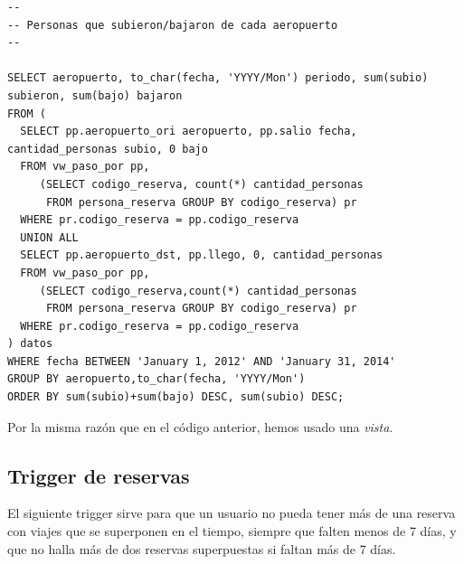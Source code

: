 \documentclass[a4paper,10pt]{article}
\begin{document}
\begin{verbatim}
--
-- Personas que subieron/bajaron de cada aeropuerto
--

SELECT aeropuerto, to_char(fecha, 'YYYY/Mon') periodo, sum(subio) subieron, sum(bajo) bajaron 
FROM (
  SELECT pp.aeropuerto_ori aeropuerto, pp.salio fecha, cantidad_personas subio, 0 bajo
  FROM vw_paso_por pp,
     (SELECT codigo_reserva, count(*) cantidad_personas
      FROM persona_reserva GROUP BY codigo_reserva) pr
  WHERE pr.codigo_reserva = pp.codigo_reserva
  UNION ALL
  SELECT pp.aeropuerto_dst, pp.llego, 0, cantidad_personas
  FROM vw_paso_por pp,
     (SELECT codigo_reserva,count(*) cantidad_personas
      FROM persona_reserva GROUP BY codigo_reserva) pr
  WHERE pr.codigo_reserva = pp.codigo_reserva
) datos
WHERE fecha BETWEEN 'January 1, 2012' AND 'January 31, 2014'
GROUP BY aeropuerto,to_char(fecha, 'YYYY/Mon')
ORDER BY sum(subio)+sum(bajo) DESC, sum(subio) DESC;

\end{verbatim}

Por la misma razón que en el código anterior, hemos usado una \textit{vista}.


\subsection{Trigger de reservas}

El siguiente trigger sirve para que un usuario no pueda tener m\'as de una reserva con viajes que se superponen en el tiempo, siempre que falten menos de 7 d\'ias, y que no halla m\'as de dos reservas superpuestas si faltan m\'as de 7 d\'ias.
\end{document}
